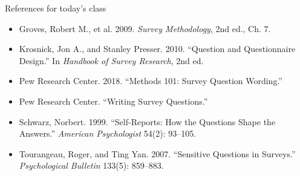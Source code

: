 \documentclass[11pt,aspectratio=169]{beamer}
\begin{document}
\begin{frame}{References for today's class}
\footnotesize
\begin{itemize}
\item Groves, Robert M., et al. 2009. \textit{Survey Methodology}, 2nd ed., Ch. 7.
\item Krosnick, Jon A., and Stanley Presser. 2010. ``Question and Questionnaire Design.'' In \textit{Handbook of Survey Research}, 2nd ed.
\item Pew Research Center. 2018. ``Methods 101: Survey Question Wording.''
\item Pew Research Center. ``Writing Survey Questions.''
\item Schwarz, Norbert. 1999. ``Self-Reports: How the Questions Shape the Answers.'' \textit{American Psychologist} 54(2): 93--105.
\item Tourangeau, Roger, and Ting Yan. 2007. ``Sensitive Questions in Surveys.'' \textit{Psychological Bulletin} 133(5): 859--883.
\end{itemize}
\end{frame}
\end{document}
